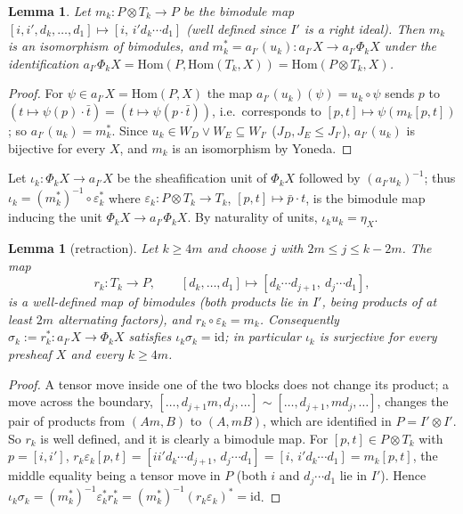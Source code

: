\documentclass[11pt]{amsart}
\newtheorem{lem}[thm]{Lemma}
\theoremstyle{definition}
\newcommand{\Hom}{\mathrm{Hom}}
\begin{document}
\begin{lem}\label{lem:mult}
Let $m_k\colon P\otimes T_k\to P$ be the bimodule map
$[i,i',d_k,\dots,d_1]\mapsto[i,\,i'd_k\cdots d_1]$ (well defined since $I'$ is a
right ideal). Then $m_k$ is an isomorphism of bimodules, and
$m_k^*=a_{I'}(u_k)\colon a_{I'}X\to a_{I'}\Phi_kX$ under the identification
$a_{I'}\Phi_kX=\Hom(P,\Hom(T_k,X))=\Hom(P\otimes T_k,X)$.
\end{lem}
\begin{proof}
For $\psi\in a_{I'}X=\Hom(P,X)$ the map $a_{I'}(u_k)(\psi)=u_k\circ\psi$ sends
$p$ to $(t\mapsto\psi(p)\cdot\bar t)=(t\mapsto\psi(p\cdot\bar t))$, i.e.\
corresponds to $[p,t]\mapsto\psi(m_k[p,t])$; so $a_{I'}(u_k)=m_k^*$. Since
$u_k\in W_D\vee W_E\subseteq W_{I'}$ ($J_D,J_E\le J_{I'}$), $a_{I'}(u_k)$ is
bijective for every $X$, and $m_k$ is an isomorphism by Yoneda.
\end{proof}

Let $\iota_k\colon\Phi_kX\to a_{I'}X$ be the sheafification unit of $\Phi_kX$
followed by $(a_{I'}u_k)^{-1}$; thus $\iota_k=(m_k^{*})^{-1}\circ\varepsilon_k^*$
where $\varepsilon_k\colon P\otimes T_k\to T_k$, $[p,t]\mapsto\bar p\cdot t$, is
the bimodule map inducing the unit $\Phi_kX\to a_{I'}\Phi_kX$. By naturality of
units, $\iota_ku_k=\eta_X$.

\begin{lem}[retraction]\label{lem:section}
Let $k\ge4m$ and choose $j$ with $2m\le j\le k-2m$. The map
\[
r_k\colon T_k\to P,\qquad[d_k,\dots,d_1]\mapsto[d_k\cdots d_{j+1},\ d_j\cdots d_1],
\]
is a well-defined map of bimodules (both products lie in $I'$, being products
of at least $2m$ alternating factors), and $r_k\circ\varepsilon_k=m_k$.
Consequently $\sigma_k:=r_k^*\colon a_{I'}X\to\Phi_kX$ satisfies
$\iota_k\sigma_k=\mathrm{id}$; in particular $\iota_k$ is surjective for every
presheaf $X$ and every $k\ge4m$.
\end{lem}
\begin{proof}
A tensor move inside one of the two blocks does not change its product; a move
across the boundary, $[\dots,d_{j+1}m,d_j,\dots]\sim[\dots,d_{j+1},md_j,\dots]$,
changes the pair of products from $(Am,B)$ to $(A,mB)$, which are identified in
$P=I'\otimes I'$. So $r_k$ is well defined, and it is clearly a bimodule map.
For $[p,t]\in P\otimes T_k$ with $p=[i,i']$,
$r_k\varepsilon_k[p,t]=[ii'd_k\cdots d_{j+1},\,d_j\cdots d_1]
=[i,\,i'd_k\cdots d_1]=m_k[p,t]$, the middle equality being a tensor move in
$P$ (both $i$ and $d_j\cdots d_1$ lie in $I'$). Hence
$\iota_k\sigma_k=(m_k^*)^{-1}\varepsilon_k^*r_k^*=(m_k^*)^{-1}(r_k\varepsilon_k)^*=\mathrm{id}$.
\end{proof}
\end{document}

